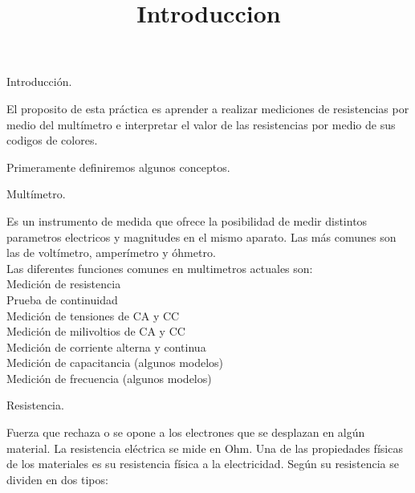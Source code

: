 
\title{Introduccion}

	\begin{center}
		\begin{huge}
		Introducci\'on.\\
		\vspace*{1.5cm}
		\end{huge}
		\end{center}
	
\begin{flushleft}
	
		El proposito de esta pr\'actica es aprender a realizar mediciones de resistencias por medio del mult\'imetro e interpretar el valor de las resistencias por medio de sus codigos de colores.\\
		\vspace*{0.5cm}
		
		Primeramente definiremos algunos conceptos.\\
		\vspace*{0.5cm}
		\begin{Large}
				Mult\'imetro.\\
		\end{Large}
		Es un instrumento de medida que ofrece la posibilidad de medir distintos parametros electricos y magnitudes en el mismo aparato. Las más comunes son las de voltímetro, amperímetro y óhmetro.\\
		\vspace*{0.5cm}
		Las diferentes funciones comunes en multimetros actuales son:\\
		Medición de resistencia\\
		Prueba de continuidad\\
		Medición de tensiones de CA y CC\\
		Medición de milivoltios de CA y CC\\
		Medición de corriente alterna y continua\\
		Medición de capacitancia (algunos modelos)\\
		Medición de frecuencia (algunos modelos)\\
		\vspace*{0.5cm}
		
		\begin{Large}
			Resistencia.\\
		\end{Large}
	
	 Fuerza que rechaza o se opone a los electrones que se desplazan en algún material. La resistencia eléctrica se mide en Ohm. Una de las propiedades físicas de los materiales es su resistencia física a la electricidad. Según su resistencia se dividen en dos tipos:\\
	 \vspace*{0.5cm}
	 		

\end{flushleft}
